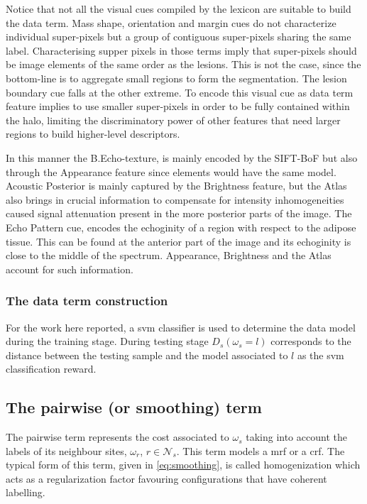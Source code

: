 Notice that not all the visual cues compiled by the lexicon are suitable to build the data term.
Mass shape, orientation and margin cues do not characterize individual super-pixels but a group of contiguous super-pixels sharing the same label.
Characterising supper pixels in those terms imply that super-pixels should be image elements of the same order as the lesions. 
This is not the case, since the bottom-line is to aggregate small regions to form the segmentation.
The lesion boundary cue falls at the other extreme.
To encode this visual cue as data term feature implies to use smaller super-pixels in order to be fully contained within the halo, limiting the discriminatory power of other features that need larger regions to build higher-level descriptors.

In this manner the B.Echo-texture, is mainly encoded by the SIFT-BoF but also through the Appearance feature since elements would have the same model.
Acoustic Posterior is mainly captured by the Brightness feature, but the Atlas also brings in crucial information to compensate for intensity inhomogeneities caused signal attenuation present in the more posterior parts of the image.
The Echo Pattern cue, encodes the echoginity of a region with respect to the adipose tissue. This can be found at the anterior part of the image and its echoginity is close to the middle of the spectrum. Appearance, Brightness and the Atlas account for such information.

\subsubsection{The data term construction}
For the work here reported, a \ac{svm} classifier is used to determine the data model during the training stage.
During testing stage $D_s(\omega_s=l)$ corresponds to the distance between the testing sample and the model associated to $l$ as the \ac{svm} classification reward. 

\subsection{The pairwise (or smoothing) term} \label{sec:method:mrfTerm}
 
The pairwise term represents the cost associated to $\omega_s$ taking into account the labels of its neighbour sites, $\omega_r$, $r \in \mathcal{N}_{s}$. 
This term models a \ac{mrf} or a \ac{crf}.
The typical form of this term, given in \cref{eq:smoothing}, is called homogenization which acts as a regularization factor favouring configurations that have coherent labelling.

